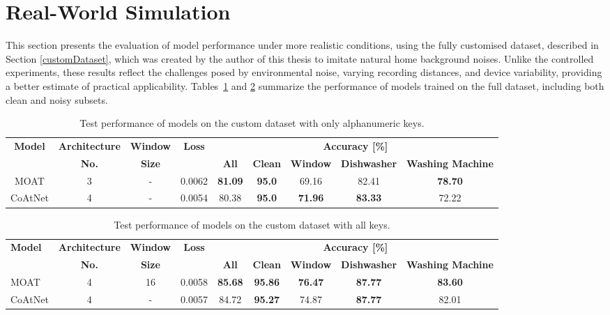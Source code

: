 \documentclass[a4paper,11pt,twoside]{report}
\theoremstyle{definition}
\begin{document}
\section{Real-World Simulation}


This section presents the evaluation of model performance under more realistic conditions, using the fully customised dataset, described in Section \ref{customDataset}, which was created by the author of this thesis to imitate natural home background noises. Unlike the controlled experiments, these results reflect the challenges posed by environmental noise, varying recording distances, and device variability, providing a better estimate of practical applicability. Tables~\ref{tab:custom_alphanumeric} and \ref{tab:custom_all_keys} summarize the performance of models trained on the full dataset, including both clean and noisy subsets.


\begin{table}[h!]
\centering
\caption{Test performance of  models on the custom dataset with only alphanumeric keys.}
\begin{adjustbox}{max width=\textwidth}
\begin{tabular}{c|c|c|c|ccccc}
\hline
\textbf{Model} & \textbf{Architecture} & \textbf{Window} & \textbf{Loss} & \multicolumn{5}{c}{\textbf{Accuracy [\%]}} \\
\cline{5-9}
       &   \textbf{No.}  &   \textbf{Size}   &   & \textbf{All} & \textbf{Clean} & \textbf{Window} & \textbf{Dishwasher} & \textbf{Washing Machine}  \\
\hline
MOAT & 3 & - & 0.0062 & \textbf{81.09} & \textbf{95.0} & 69.16 & 82.41 & \textbf{78.70} \\
CoAtNet & 4 & - & 0.0054 & 80.38 & \textbf{95.0} & \textbf{71.96} & \textbf{83.33} & 72.22 \\
\hline
\end{tabular}
\end{adjustbox}
\label{tab:custom_alphanumeric}
\end{table}


\begin{table}[h!]
\centering
\caption{Test performance of models on the custom dataset with all keys.}
\begin{adjustbox}{max width=\textwidth}
\begin{tabular}{l|c|c|c|ccccc}
\hline
\textbf{Model} & \textbf{Architecture} & \textbf{Window} & \textbf{Loss} & \multicolumn{5}{c}{\textbf{Accuracy [\%]}} \\
\cline{5-9}
       &   \textbf{No.}  &   \textbf{Size}   &   & \textbf{All} & \textbf{Clean} & \textbf{Window} & \textbf{Dishwasher} & \textbf{Washing Machine}  \\
\hline
MOAT & 4 & 16 & 0.0058 & \textbf{85.68} & \textbf{95.86} & \textbf{76.47} & \textbf{87.77} & \textbf{83.60} \\
CoAtNet & 4 & - & 0.0057 & 84.72 & \textbf{95.27} & 74.87 & \textbf{87.77} & 82.01 \\
\hline
\end{tabular}
\end{adjustbox}
\label{tab:custom_all_keys}
\end{table}
\end{document}
